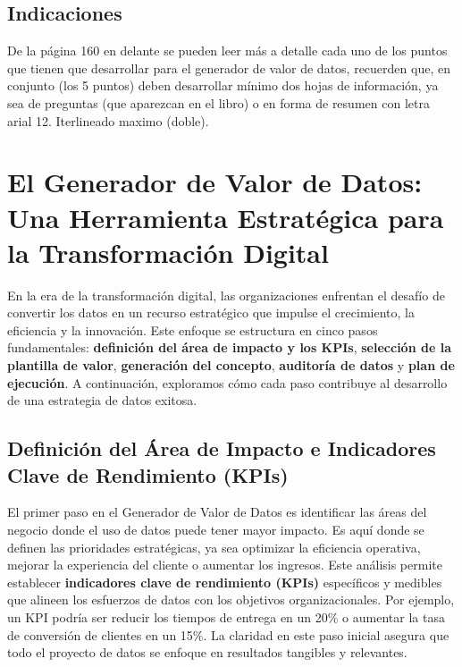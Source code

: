 



	\clearpage
	\vspace*{-16pt}
	\begin{center}
		{\textbf{\huge \theTitle}}
	\end{center}
	\vspace*{8pt}

	\subsection*{Indicaciones}

	De la página 160 en delante se pueden leer más a detalle cada uno de los
	puntos que tienen que desarrollar para el generador de valor de datos, recuerden
	que, en conjunto (los 5 puntos) deben desarrollar mínimo dos hojas de
	información, ya sea de preguntas (que aparezcan en el libro) o en forma de resumen
	con letra arial 12. Iterlineado maximo (doble).

	\clearpage
	\section{El Generador de Valor de Datos: Una Herramienta Estratégica para la Transformación
	Digital}
	En la era de la transformación digital, las organizaciones enfrentan el
	desafío de convertir los datos en un recurso estratégico que impulse el
	crecimiento, la eficiencia y la innovación. Este enfoque se estructura en
	cinco pasos fundamentales: \textbf{definición del área de impacto y los KPIs},
	\textbf{selección de la plantilla de valor}, \textbf{generación del concepto},
	\textbf{auditoría de datos} y \textbf{plan de ejecución}. A continuación, exploramos
	cómo cada paso contribuye al desarrollo de una estrategia de datos exitosa.

	\subsection{Definición del Área de Impacto e Indicadores Clave de Rendimiento
	(KPIs)}

	El primer paso en el Generador de Valor de Datos es identificar las áreas del
	negocio donde el uso de datos puede tener mayor impacto. Es aquí donde se definen
	las prioridades estratégicas, ya sea optimizar la eficiencia operativa, mejorar
	la experiencia del cliente o aumentar los ingresos. Este análisis permite
	establecer \textbf{indicadores clave de rendimiento (KPIs)} específicos y medibles
	que alineen los esfuerzos de datos con los objetivos organizacionales. Por
	ejemplo, un KPI podría ser reducir los tiempos de entrega en un 20\% o
	aumentar la tasa de conversión de clientes en un 15\%. La claridad en este
	paso inicial asegura que todo el proyecto de datos se enfoque en resultados
	tangibles y relevantes.

